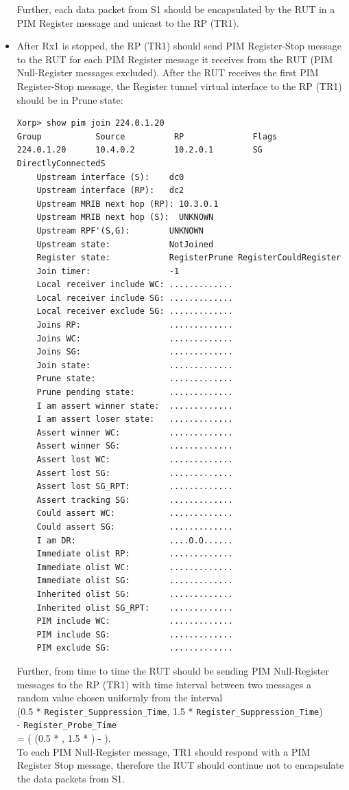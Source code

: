 \documentclass[11pt]{report}
\begin{document}
\begin{itemize}
  Further, each data packet from S1 should be encapsulated by the RUT in a
  PIM Register message and unicast to the RP (TR1).

  \item After Rx1 is stopped, the RP (TR1) should send PIM Register-Stop
  message to the RUT for each PIM Register message it receives from the RUT
  (PIM Null-Register messages excluded). After the RUT receives the first
  PIM Register-Stop message, the Register tunnel virtual interface to the RP
  (TR1) should be in Prune state:

\begin{verbatim}
Xorp> show pim join 224.0.1.20
Group           Source          RP              Flags
224.0.1.20      10.4.0.2        10.2.0.1        SG DirectlyConnectedS 
    Upstream interface (S):    dc0
    Upstream interface (RP):   dc2
    Upstream MRIB next hop (RP): 10.3.0.1
    Upstream MRIB next hop (S):  UNKNOWN
    Upstream RPF'(S,G):        UNKNOWN
    Upstream state:            NotJoined 
    Register state:            RegisterPrune RegisterCouldRegister 
    Join timer:                -1
    Local receiver include WC: .............
    Local receiver include SG: .............
    Local receiver exclude SG: .............
    Joins RP:                  .............
    Joins WC:                  .............
    Joins SG:                  .............
    Join state:                .............
    Prune state:               .............
    Prune pending state:       .............
    I am assert winner state:  .............
    I am assert loser state:   .............
    Assert winner WC:          .............
    Assert winner SG:          .............
    Assert lost WC:            .............
    Assert lost SG:            .............
    Assert lost SG_RPT:        .............
    Assert tracking SG:        .............
    Could assert WC:           .............
    Could assert SG:           .............
    I am DR:                   ....O.O......
    Immediate olist RP:        .............
    Immediate olist WC:        .............
    Immediate olist SG:        .............
    Inherited olist SG:        .............
    Inherited olist SG_RPT:    .............
    PIM include WC:            .............
    PIM include SG:            .............
    PIM exclude SG:            .............
\end{verbatim}

  Further, from time to time the RUT should be sending PIM Null-Register
  messages to the RP (TR1) with time interval between two messages a random
  value chosen uniformly from the interval \\
  (0.5 * \verb=Register_Suppression_Time=,
  1.5 * \verb=Register_Suppression_Time=) \\
  - \verb=Register_Probe_Time= \\
  = ( (0.5 * {\PimsmRegisterSuppressionTime}, 1.5 *
  {\PimsmRegisterSuppressionTime}) - {\PimsmRegisterProbeTime} ).\\
  To each PIM Null-Register message, TR1 should respond with a PIM Register
  Stop message, therefore the RUT should continue not to encapsulate the data
  packets from S1.


\end{itemize}
\end{document}
